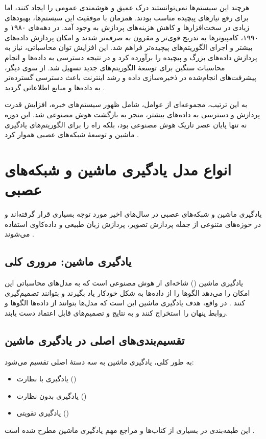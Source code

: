 هرچند این سیستم‌ها نمی‌توانستند درک عمیق و هوشمندی عمومی را ایجاد کنند، اما برای رفع نیازهای پیچیده مناسب بودند. همزمان با موفقیت این سیستم‌ها، بهبودهای زیادی در سخت‌افزارها و کاهش هزینه‌های پردازش به وجود آمد. در دهه‌های ۱۹۸۰ و ۱۹۹۰، کامپیوترها به تدریج قوی‌تر و مقرون به صرفه‌تر شدند و امکان پردازش داده‌های بیشتر و اجرای الگوریتم‌های پیچیده‌تر فراهم شد. این افزایش توان محاسباتی، نیاز به پردازش داده‌های بزرگ و پیچیده را برآورده کرد و در نتیجه دسترسی به داده‌ها و انجام محاسبات سنگین برای توسعهٔ الگوریتم‌های جدید تسهیل شد. از سوی دیگر، پیشرفت‌های انجام‌شده در ذخیره‌سازی داده و رشد اینترنت باعث دسترسی گسترده‌تر به داده‌ها و منابع اطلاعاتی گردید \cite{nilsson2010quest}.

به این ترتیب، مجموعه‌ای از عوامل، شامل ظهور سیستم‌های خبره، افزایش قدرت پردازش و دسترسی به داده‌های بیشتر، منجر به بازگشت هوش مصنوعی شد. این دوره نه تنها پایان عصر تاریک هوش مصنوعی بود، بلکه راه را برای الگوریتم‌های یادگیری ماشین و توسعهٔ شبکه‌های عصبی هموار کرد \cite{russell2016artificial}.


\section{انواع مدل یادگیری ماشین و شبکه‌های عصبی}\label{sec:ml-types}
یادگیری ماشین و شبکه‌های عصبی در سال‌های اخیر مورد توجه بسیاری قرار گرفته‌اند و در حوزه‌های متنوعی از جمله پردازش تصویر، پردازش زبان طبیعی و داده‌کاوی استفاده می‌شوند
\cite{bishop2006pattern,mitchell1997machine,murphy2012machine}.

\subsection{یادگیری ماشین: مروری کلی}
یادگیری ماشین () شاخه‌ای از هوش مصنوعی است که به مدل‌های محاسباتی این امکان را می‌دهد الگوها را از داده‌ها به شکل خودکار یاد بگیرند و بتوانند تصمیم‌گیری کنند
\cite{goodfellow2016deep,mitchell1997machine}.
در واقع، هدف یادگیری ماشین این است که مدل‌ها بتوانند از داده‌ها الگوها و روابط پنهان را استخراج کنند و به نتایج و تصمیم‌های قابل اعتماد دست یابند.

\subsection{تقسیم‌بندی‌های اصلی در یادگیری ماشین}
به طور کلی، یادگیری ماشین به سه دستهٔ اصلی تقسیم می‌شود:
\begin{itemize}
	\item یادگیری با نظارت ()
	\item یادگیری بدون نظارت ()
	\item یادگیری تقویتی ()
\end{itemize}
این طبقه‌بندی در بسیاری از کتاب‌ها و مراجع مهم یادگیری ماشین مطرح شده است
\cite{bishop2006pattern,murphy2012machine}.

